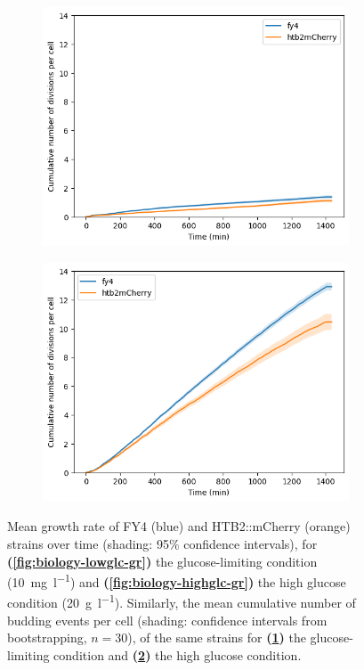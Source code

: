 \begin{figure}
  \begin{subfigure}[htpb]{0.45\textwidth}
   \centering
   \includegraphics[width=\textwidth]{allstrains_31492_cumul}
   \caption{
   }
   \label{fig:biology-lowglc-cumul}
  \end{subfigure}%
  \begin{subfigure}[htpb]{0.45\textwidth}
   \centering
   \includegraphics[width=\textwidth]{allstrains_26643_cumul}
   \caption{
   }
   \label{fig:biology-highglc-cumul}
  \end{subfigure}

  \caption{
    Mean growth rate of FY4 (blue) and HTB2::mCherry (orange) strains over time (shading: 95\% confidence intervals), for \textbf{(\ref{fig:biology-lowglc-gr})} the glucose-limiting condition (\SI{10}{\milli\gram~\litre^{-1}}) and \textbf{(\ref{fig:biology-highglc-gr})} the high glucose condition (\SI{20}{\gram~\litre^{-1}}).
    Similarly, the mean cumulative number of budding events per cell (shading: confidence intervals from bootstrapping, $n=30$), of the same strains for \textbf{(\ref{fig:biology-lowglc-cumul})} the glucose-limiting condition and \textbf{(\ref{fig:biology-highglc-cumul})} the high glucose condition.
  }
  \label{fig:biology-lowglc-gr-budprob}
\end{figure}


